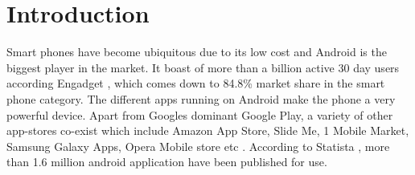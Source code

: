 \section{Introduction}
\label{intro}
Smart phones have become ubiquitous due to its low cost and Android is the biggest player in the market. It boast of more than a billion active 30 day users according Engadget \cite{Engadget_market_share}, which comes down to 84.8\% market share in the smart phone category. The different apps running on Android make the phone a very powerful device. Apart from Googles dominant Google Play, a variety of other app-stores co-exist which include Amazon App Store, Slide Me, 1 Mobile Market, Samsung Galaxy Apps, Opera Mobile store etc \cite{Online_App_Stores}. According to Statista \cite{Android_app_number}, more than 1.6 million android application have been published for use.

